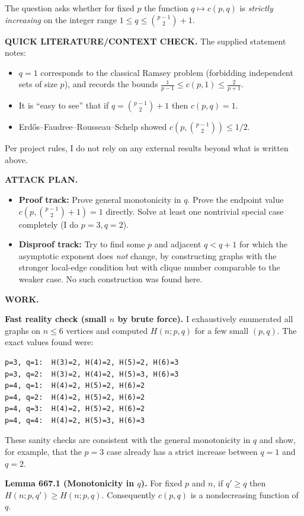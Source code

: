 The question asks whether for fixed $p$ the function $q\mapsto c(p,q)$ is \emph{strictly increasing} on the integer range
$1\le q\le \binom{p-1}{2}+1$.

\bigskip
\noindent\textbf{QUICK LITERATURE/CONTEXT CHECK.}
The supplied statement notes:
\begin{itemize}
\item $q=1$ corresponds to the classical Ramsey problem (forbidding independent sets of size $p$), and records the bounds $\frac1{p-1}\le c(p,1)\le \frac{2}{p+1}$.
\item It is ``easy to see'' that if $q=\binom{p-1}{2}+1$ then $c(p,q)=1$.
\item Erd\H{o}s--Faudree--Rousseau--Schelp showed $c(p,\binom{p-1}{2})\le 1/2$.
\end{itemize}
Per project rules, I do not rely on any external results beyond what is written above.

\bigskip
\noindent\textbf{ATTACK PLAN.}
\begin{itemize}
\item \textbf{Proof track:} Prove general monotonicity in $q$. Prove the endpoint value $c(p,\binom{p-1}{2}+1)=1$ directly. Solve at least one nontrivial special case completely (I do $p=3,q=2$).
\item \textbf{Disproof track:} Try to find some $p$ and adjacent $q<q+1$ for which the asymptotic exponent does \emph{not} change, by constructing graphs with the stronger local-edge condition but with clique number comparable to the weaker case. No such construction was found here.
\end{itemize}

\bigskip
\noindent\textbf{WORK.}

\medskip
\noindent\textbf{Fast reality check (small $n$ by brute force).}
I exhaustively enumerated all graphs on $n\le 6$ vertices and computed $H(n;p,q)$ for a few small $(p,q)$.
The exact values found were:
\begin{verbatim}
p=3, q=1:  H(3)=2, H(4)=2, H(5)=2, H(6)=3
p=3, q=2:  H(3)=2, H(4)=2, H(5)=3, H(6)=3
p=4, q=1:  H(4)=2, H(5)=2, H(6)=2
p=4, q=2:  H(4)=2, H(5)=2, H(6)=2
p=4, q=3:  H(4)=2, H(5)=2, H(6)=2
p=4, q=4:  H(4)=2, H(5)=3, H(6)=3
\end{verbatim}
These sanity checks are consistent with the general monotonicity in $q$ and show, for example, that the $p=3$ case already has a strict increase between $q=1$ and $q=2$.

\medskip
\noindent\textbf{Lemma 667.1 (Monotonicity in $q$).}
For fixed $p$ and $n$, if $q'\ge q$ then $H(n;p,q')\ge H(n;p,q)$.
Consequently $c(p,q)$ is a nondecreasing function of $q$.

